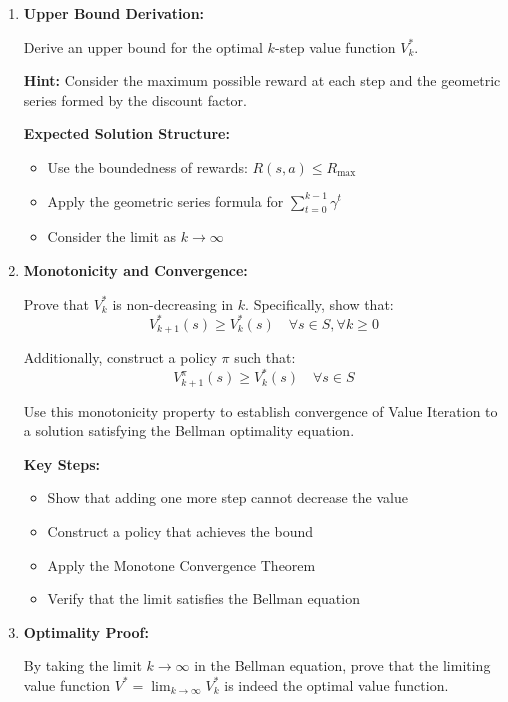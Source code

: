 \documentclass[12pt]{article}
\begin{document}
{{\begin{enumerate}
    \item \textbf{Upper Bound Derivation:}
    
    Derive an upper bound for the optimal \( k \)-step value function \( V_k^* \).
    
    \textbf{Hint:} Consider the maximum possible reward at each step and the geometric series formed by the discount factor.
    
    \textbf{Expected Solution Structure:}
    \begin{itemize}
        \item Use the boundedness of rewards: \( R(s,a) \leq R_{\text{max}} \)
        \item Apply the geometric series formula for \( \sum_{t=0}^{k-1} \gamma^t \)
        \item Consider the limit as \( k \rightarrow \infty \)
    \end{itemize}

    \item \textbf{Monotonicity and Convergence:}
    
    Prove that \( V_k^* \) is non-decreasing in \( k \). Specifically, show that:
    \[
    V_{k+1}^*(s) \geq V_k^*(s) \quad \forall s \in S, \forall k \geq 0
    \]
    
    Additionally, construct a policy \( \pi \) such that:
    \[
    V_{k+1}^\pi(s) \geq V_k^*(s) \quad \forall s \in S
    \]
    
    Use this monotonicity property to establish convergence of Value Iteration to a solution satisfying the Bellman optimality equation.
    
    \textbf{Key Steps:}
    \begin{itemize}
        \item Show that adding one more step cannot decrease the value
        \item Construct a policy that achieves the bound
        \item Apply the Monotone Convergence Theorem
        \item Verify that the limit satisfies the Bellman equation
    \end{itemize}

    \item \textbf{Optimality Proof:}
    
    By taking the limit \( k \rightarrow \infty \) in the Bellman equation, prove that the limiting value function \( V^* = \lim_{k \rightarrow \infty} V_k^* \) is indeed the optimal value function.
    

\end{enumerate}}}
\end{document}
